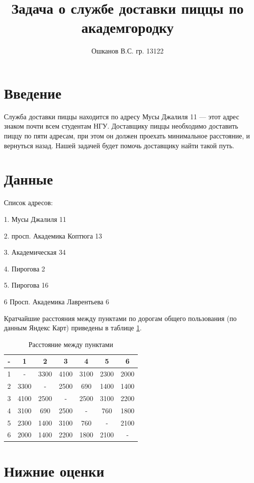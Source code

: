 \documentclass[]{article}
\title{Задача о службе доставки пиццы по академгородку}
\author{Ошканов В.С. гр. 13122}
\begin{document}
\maketitle
\section{Введение}
\par\indent

Служба доставки пиццы находится по адресу Мусы Джалиля 11 --- этот адрес знаком
почти всем студентам НГУ. Доставщику пиццы необходимо доставить пиццу по пяти
адресам, при этом он должен проехать минимальное расстояние, и вернуться назад.
 Нашей задачей будет помочь доставщику найти такой путь.
\section{Данные}
Список адресов:

1. Мусы Джалиля 11

2. просп. Академика Коптюга 13

3. Академическая 34

4. Пирогова 2

5. Пирогова 16

6 Просп. Академика Лаврентьева 6


Кратчайшие расстояния между пунктами по дорогам общего пользования
(по данным Яндекс Карт) приведены в таблице \ref{tab:1}.


\begin{table}\caption{Расстояние между пунктами}\label{tab:1}
\centering
\begin{tabular}{|c|c|c|c|c|c|c|}
	\hline
- &    1  &   2  &   3  &   4  &   5  &  6  \\
\hline
1 &   -  & 3300 & 4100 & 3100 & 2300 & 2000 \\
\hline
2 & 3300 &  -   & 2500 &  690 & 1400 & 1400 \\
\hline
3 & 4100 & 2500 &  -   & 2500 & 3100 & 2200 \\
\hline
4	& 3100 &  690 & 2500 &  -   & 760  & 1800 \\
\hline
5	& 2300 & 1400 & 3100 &  760 &  -   & 2100 \\
\hline
6 & 2000 & 1400 & 2200 & 1800 & 2100 &  -   \\
\hline

\hline
\end{tabular}
\end{table}

\section{Нижние оценки}
\end{document}
